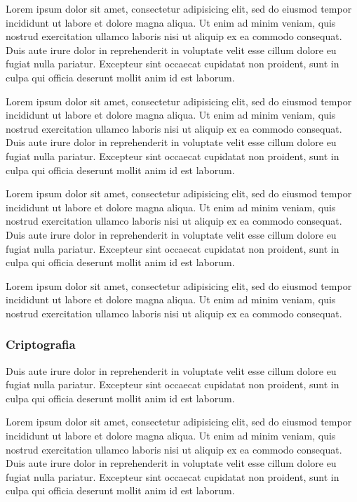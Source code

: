 \documentclass[
	12pt,				%
	twoside,			%
	a4paper,			%
	chapter=TITLE,		%
	english,			%
	brazil				%
	]{tcc}
\begin{document}
	Lorem ipsum dolor sit amet, consectetur adipisicing elit, sed do eiusmod
	tempor incididunt ut labore et dolore magna aliqua. Ut enim ad minim veniam,
	quis nostrud exercitation ullamco laboris nisi ut aliquip ex ea commodo
	consequat. Duis aute irure dolor in reprehenderit in voluptate velit esse
	cillum dolore eu fugiat nulla pariatur. Excepteur sint occaecat cupidatat non
	proident, sunt in culpa qui officia deserunt mollit anim id est laborum.

	Lorem ipsum dolor sit amet, consectetur adipisicing elit, sed do eiusmod
	tempor incididunt ut labore et dolore magna aliqua. Ut enim ad minim veniam,
	quis nostrud exercitation ullamco laboris nisi ut aliquip ex ea commodo
	consequat. Duis aute irure dolor in reprehenderit in voluptate velit esse
	cillum dolore eu fugiat nulla pariatur. Excepteur sint occaecat cupidatat non
	proident, sunt in culpa qui officia deserunt mollit anim id est laborum.

	Lorem ipsum dolor sit amet, consectetur adipisicing elit, sed do eiusmod
	tempor incididunt ut labore et dolore magna aliqua. Ut enim ad minim veniam,
	quis nostrud exercitation ullamco laboris nisi ut aliquip ex ea commodo
	consequat. Duis aute irure dolor in reprehenderit in voluptate velit esse
	cillum dolore eu fugiat nulla pariatur. Excepteur sint occaecat cupidatat non
	proident, sunt in culpa qui officia deserunt mollit anim id est laborum.

	Lorem ipsum dolor sit amet, consectetur adipisicing elit, sed do eiusmod
	tempor incididunt ut labore et dolore magna aliqua. Ut enim ad minim veniam,
	quis nostrud exercitation ullamco laboris nisi ut aliquip ex ea commodo
	consequat.

	\subsubsection{Criptografia}

	 Duis aute irure dolor in reprehenderit in voluptate velit esse
	cillum dolore eu fugiat nulla pariatur. Excepteur sint occaecat cupidatat non
	proident, sunt in culpa qui officia deserunt mollit anim id est laborum.

	Lorem ipsum dolor sit amet, consectetur adipisicing elit, sed do eiusmod
	tempor incididunt ut labore et dolore magna aliqua. Ut enim ad minim veniam,
	quis nostrud exercitation ullamco laboris nisi ut aliquip ex ea commodo
	consequat. Duis aute irure dolor in reprehenderit in voluptate velit esse
	cillum dolore eu fugiat nulla pariatur. Excepteur sint occaecat cupidatat non
	proident, sunt in culpa qui officia deserunt mollit anim id est laborum.
\end{document}
